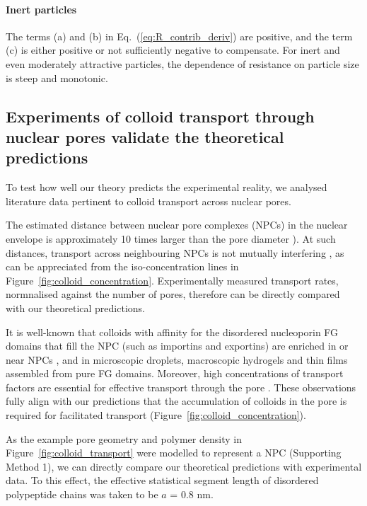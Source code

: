 \documentclass[12pt, a4paper]{article}
\begin{document}
\paragraph{Inert particles}
The terms (a) and (b) in Eq.~(\ref{eq:R_contrib_deriv}) are positive, and the term (c) is either positive or not sufficiently negative to compensate.
For inert and even moderately attractive particles, the dependence of resistance on particle size is steep and monotonic.


\subsection{Experiments of colloid transport through nuclear pores validate the theoretical predictions}

To test how well our theory predicts the experimental reality, we analysed literature data pertinent to colloid transport across nuclear pores.

The estimated distance between nuclear pore complexes (NPCs) in the nuclear envelope is approximately 10 times larger than the pore diameter \cite{Yang2004, Daigle2001, Feldherr1984, Kubitscheck2000}). At such distances, transport across neighbouring NPCs is not mutually interfering \cite{Fabrikant1985}, as can be appreciated from the iso-concentration lines in Figure~\ref{fig:colloid_concentration}. Experimentally measured transport rates, normnalised against the number of pores, therefore can be directly compared with our theoretical predictions.  

It is well-known that colloids with affinity for the disordered nucleoporin FG domains that fill the NPC (such as importins and exportins) are enriched in or near NPCs \cite{Beck2007, Gruenwald2010, Tu2011}, and in microscopic droplets, macroscopic hydrogels and thin films assembled from pure FG domains.
Moreover, high concentrations of transport factors are essential for effective transport through the pore \cite{Lowe2015}.
These observations fully align with our predictions that the accumulation of colloids in the pore is required for facilitated transport (Figure~\ref{fig:colloid_concentration}).

As the example pore geometry and polymer density in Figure~\ref{fig:colloid_transport} were modelled to represent a NPC (Supporting Method 1), we can directly compare our theoretical predictions with experimental data. To this effect, the effective statistical segment length of disordered polypeptide chains was taken to be $a$ = 0.8 nm. 
\end{document}
